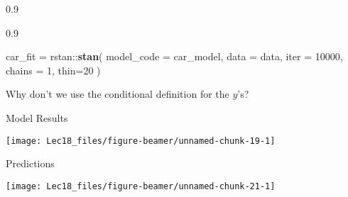 \documentclass[11pt,ignorenonframetext,]{beamer}
\newenvironment{Shaded}{}{}
\newcommand{\DataTypeTok}[1]{\textcolor[rgb]{0.56,0.13,0.00}{#1}}
\newcommand{\DecValTok}[1]{\textcolor[rgb]{0.25,0.63,0.44}{#1}}
\newcommand{\KeywordTok}[1]{\textcolor[rgb]{0.00,0.44,0.13}{\textbf{#1}}}
\newcommand{\NormalTok}[1]{#1}
\newcommand{\OperatorTok}[1]{\textcolor[rgb]{0.40,0.40,0.40}{#1}}
\newcommand{\StringTok}[1]{\textcolor[rgb]{0.25,0.44,0.63}{#1}}
\let\oldShaded\Shaded
\let\endoldShaded\endShaded
\renewenvironment{Shaded}{\footnotesize\begin{spacing}{0.9}\oldShaded}{\endoldShaded\end{spacing}}
\begin{document}
\begin{frame}[fragile]{}
\protect\hypertarget{section-2}{}

\begin{Shaded}
\end{Shaded}

\begin{Shaded}
\begin{Highlighting}[]
\NormalTok{car_fit =}\StringTok{ }\NormalTok{rstan}\OperatorTok{::}\KeywordTok{stan}\NormalTok{(}
  \DataTypeTok{model_code =}\NormalTok{ car_model, }\DataTypeTok{data =}\NormalTok{ data,}
  \DataTypeTok{iter =} \DecValTok{10000}\NormalTok{, }\DataTypeTok{chains =} \DecValTok{1}\NormalTok{, }\DataTypeTok{thin=}\DecValTok{20}
\NormalTok{)}
\end{Highlighting}
\end{Shaded}

\pause

\vspace{10mm}

Why don't we use the conditional definition for the \(y\)'s?

\end{frame}

\begin{frame}{Model Results}
\protect\hypertarget{model-results}{}

\begin{center}\texttt{[image: Lec18\_files/figure-beamer/unnamed-chunk-19-1]} \end{center}

\end{frame}

\begin{frame}{Predictions}
\protect\hypertarget{predictions-1}{}

\begin{center}\texttt{[image: Lec18\_files/figure-beamer/unnamed-chunk-21-1]} \end{center}

\end{frame}
\end{document}
